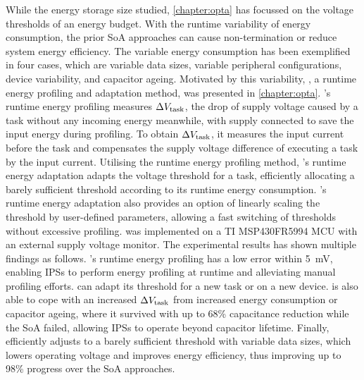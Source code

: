 \begin{enumerate}
While the energy storage size studied, \cref{chapter:opta} has focussed on the voltage thresholds of an energy budget. 
With the runtime variability of energy consumption, the prior SoA approaches can cause non-termination or reduce system energy efficiency.
The variable energy consumption has been exemplified in four cases, which are variable data sizes, variable peripheral configurations, device variability, and capacitor ageing. 
Motivated by this variability, \nn{}, a runtime energy profiling and adaptation method, was presented in \cref{chapter:opta}. 
\nn{}'s runtime energy profiling measures $\Delta V_{\text{task}}$, the drop of supply voltage caused by a task without any incoming energy meanwhile, with supply connected to save the input energy during profiling.
To obtain $\Delta V_{\text{task}}$, it measures the input current before the task and compensates the supply voltage difference of executing a task by the input current.
Utilising the runtime energy profiling method, \nn{}'s runtime energy adaptation adapts the voltage threshold for a task, efficiently allocating a barely sufficient threshold according to its runtime energy consumption. 
\nn{}'s runtime energy adaptation also provides an option of linearly scaling the threshold by user-defined parameters, allowing a fast switching of thresholds without excessive profiling. 
\nn{} was implemented on a TI MSP430FR5994 MCU with an external supply voltage monitor. 
The experimental results has shown multiple findings as follows.
\nn{}'s runtime energy profiling has a low error within \SI{5}{\milli\volt}, enabling IPSs to perform energy profiling at runtime and alleviating manual profiling efforts.
\nn{} can adapt its threshold for a new task or on a new device. 
\nn{} is also able to cope with an increased $\Delta V_{\text{task}}$ from increased energy consumption or capacitor ageing, where it survived with up to 68\% capacitance reduction while the SoA failed, allowing IPSs to operate beyond capacitor lifetime. 
Finally, \nn{} efficiently adjusts to a barely sufficient threshold with variable data sizes, which lowers operating voltage and improves energy efficiency, thus improving up to 98\% progress over the SoA approaches.

\end{enumerate}


